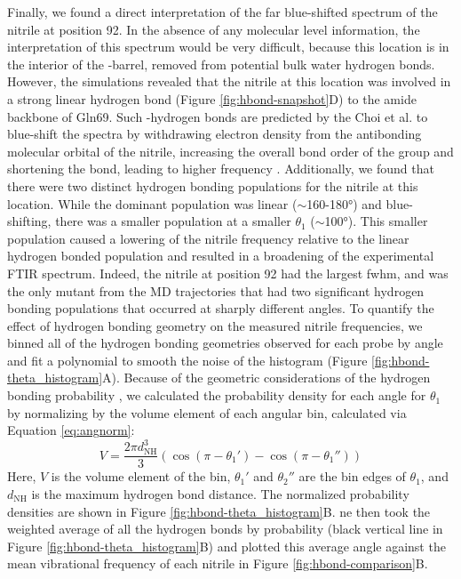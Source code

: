 Finally, we found a direct interpretation of the far blue-shifted spectrum of the nitrile at position 92.
In the absence of any molecular level information, the interpretation of this spectrum would be very difficult, because this location is in the interior of the \textbeta{}-barrel, removed from potential bulk water hydrogen bonds.
However, the simulations revealed that the nitrile at this location was involved in a strong linear hydrogen bond (Figure \ref{fig:hbond-snapshot}D) to the amide backbone of Gln69.
Such \textsigma{}-hydrogen bonds are predicted by the Choi et al. to blue-shift the spectra by withdrawing electron density from the antibonding molecular orbital of the nitrile, increasing the overall bond order of the group and shortening the bond, leading to higher frequency \cite{Getahun2003, Adhikary2014, Eaton1988}.
Additionally, we found that there were two distinct hydrogen bonding populations for the nitrile at this location.
While the dominant population was linear ($\sim$160-\ang{180}) and blue-shifting, there was a smaller population at a smaller $\theta_1$ ($\sim$\ang{100}).
This smaller population caused a lowering of the nitrile frequency relative to the linear hydrogen bonded population and resulted in a broadening of the experimental FTIR spectrum.
Indeed, the nitrile at position 92 had the largest fwhm, and was the only mutant from the MD trajectories that had two significant hydrogen bonding populations that occurred at sharply different angles. 
To quantify the effect of hydrogen bonding geometry on the measured nitrile frequencies, we binned all of the hydrogen bonding geometries observed for each probe by angle and fit a polynomial to smooth the noise of the histogram (Figure \ref{fig:hbond-theta_histogram}A).
Because of the geometric considerations of the hydrogen bonding probability \cite{Kroon1975}, we calculated the probability density for each angle for $\theta_1$ by normalizing by the volume element of each angular bin, calculated via Equation \ref{eq:angnorm}: 
\begin{equation}
    V = \frac{2\pi d^3_{\text{NH}}}{3}(\cos(\pi-\theta_1') - \cos(\pi - \theta_1'')) 
    \label{eq:angnorm}
\end{equation}
Here, $V$ is the volume element of the bin, $\theta_1'$ and $\theta_2''$ are the bin edges of $\theta_1$, and $d_{\text{NH}}$ is the maximum hydrogen bond distance.
The normalized probability densities are shown in Figure \ref{fig:hbond-theta_histogram}B.
ne then took the weighted average of all the hydrogen bonds by probability (black vertical line in Figure \ref{fig:hbond-theta_histogram}B) and plotted this average angle against the mean vibrational frequency of each nitrile in Figure \ref{fig:hbond-comparison}B. 

